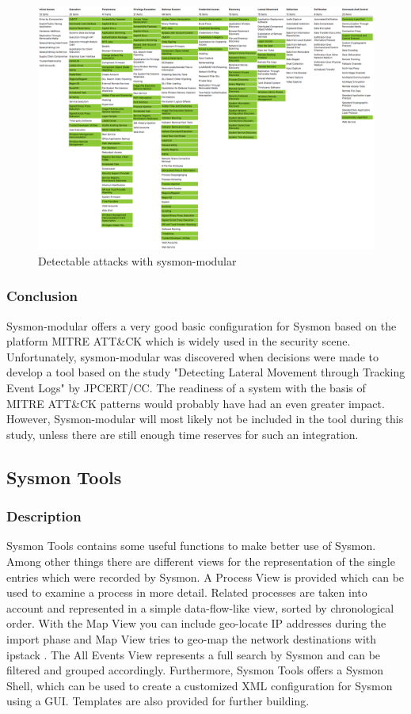\begin{figure}[H]
    \centering
    \includegraphics[width=1\linewidth]{assets/sysmon-modular/sysmon-modular.png}
    \caption{Detectable attacks with sysmon-modular}\label{fig:sysmonmodular}
\end{figure}

\subsubsection{Conclusion}
Sysmon-modular offers a very good basic configuration for Sysmon based on the platform MITRE ATT\&CK which is widely used in the security scene. Unfortunately, sysmon-modular was discovered when decisions were made to develop a tool based on the study "Detecting Lateral Movement through Tracking Event Logs" by JPCERT/CC. The readiness of a system with the basis of MITRE ATT\&CK patterns would probably have had an even greater impact. However, Sysmon-modular will most likely not be included in the tool during this study, unless there are still enough time reserves for such an integration.

\subsection{Sysmon Tools}
\subsubsection{Description}
Sysmon Tools \cite{SysmonTools} contains some useful functions to make better use of Sysmon. Among other things there are different views for the representation of the single entries which were recorded by Sysmon. A Process View is provided which can be used to examine a process in more detail. Related processes are taken into account and represented in a simple data-flow-like view, sorted by chronological order. With the Map View you can include geo-locate IP addresses during the import phase and Map View tries to geo-map the network destinations with ipstack \cite{ipstack}. The All Events View represents a full search by Sysmon and can be filtered and grouped accordingly. Furthermore, Sysmon Tools offers a Sysmon Shell, which can be used to create a customized XML configuration for Sysmon using a GUI. Templates are also provided for further building.
